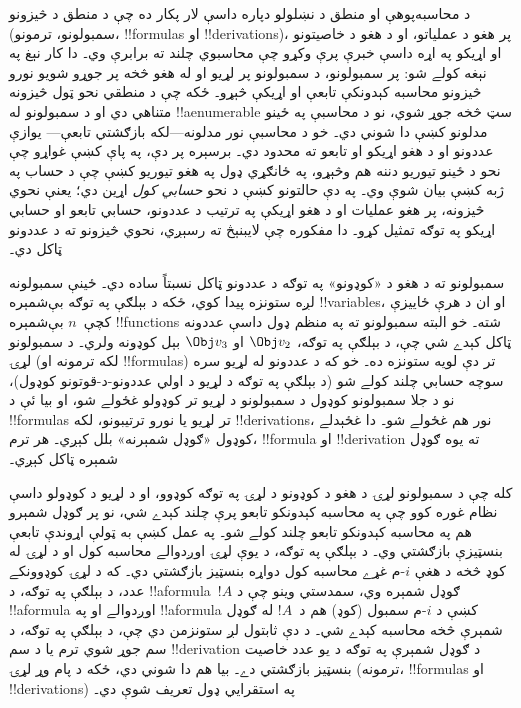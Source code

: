 \documentclass[../../../include/open-logic-section]{subfiles}
\begin{document}

د محاسبه‌پوهې او منطق د نښلولو دپاره داسې لار پکار ده چې د منطق د
څيزونو (سمبولونو، ترمونو، !!{formula}s او !!{derivation}s)، پر هغو د
عملياتو، او د هغو د خاصيتونو او اړيکو په اړه داسې خبرې پرې وکړو چې
محاسبوي چلند ته برابرې وي۔ دا کار نېغ په نېغه کولے شو: پر سمبولونو،
د سمبولونو پر لړيو او له هغو څخه پر جوړو شويو نورو څيزونو محاسبه
کېدونکې تابعې او اړيکې څېړو۔ ځکه چې د منطقي نحو ټول څيزونه متناهي دي
او د سمبولونو له !!a{enumerable} سټ څخه جوړ شوي، نو د محاسبې په ځينو
مدلونو کښې دا شوني دي۔ خو د محاسبې نور مدلونه---لکه بازګشتي تابعې---
يوازې عددونو او د هغو اړيکو او تابعو ته محدود دي۔ برسېره پر دې، په
پاې کښې غواړو چې نحو د ځينو تيوريو دننه هم وڅېړو، په ځانګړي ډول په
هغو تيوريو کښې چې د حساب په ژبه کښې بيان شوې وي۔ په دې حالتونو کښې
د نحو \emph{حسابي کول} اړين دي؛ يعنې نحوي څيزونه، پر هغو عمليات او د
هغو اړيکې په ترتيب د عددونو، حسابي تابعو او حسابي اړيکو په توګه
تمثيل کړو۔ دا مفکوره چې لايبنېڅ ته رسېږي، نحوي څيزونو ته د عددونو
ټاکل دي۔

سمبولونو ته د هغو د «کوډونو» په توګه د عددونو ټاکل نسبتاً ساده دي۔
ځينې سمبولونه لږه ستونزه پيدا کوي، ځکه د بېلګې په توګه بې‌شمېره
!!{variable}s، او ان د هرې ځاييزې کچې~$n$ بې‌شمېره !!{function}s شته۔ خو
البته سمبولونو ته په منظم ډول داسې عددونه ټاکل کېدے شي چې، د بېلګې
په توګه، $\Obj v_2$ او $\Obj v_3$ بېل کوډونه ولري۔ د سمبولونو لړۍ
(لکه ترمونه او !!{formula}s) تر دې لويه ستونزه ده۔ خو که د عددونو له
لړيو سره سوچه حسابي چلند کولے شو (د بېلګې په توګه د لړيو د اولي
عددونو-د-قوتونو کوډول)، نو د جلا سمبولونو کوډول د سمبولونو د لړيو تر
کوډولو غځولے شو، او بيا ئې د !!{formula}s تر لړيو يا نورو ترتيبونو،
لکه !!{derivation}s، نور هم غځولے شو۔ دا غځېدلے کوډول «ګوډل شمېرنه»
بلل کېږي۔ هر ترم، !!{formula} او !!{derivation} ته يوه ګوډل شمېره
ټاکل کېږي۔

کله چې د سمبولونو لړۍ د هغو د کوډونو د لړۍ په توګه کوډوو، او د لړيو
د کوډولو داسې نظام غوره کوو چې په محاسبه کېدونکو تابعو پرې چلند کېدے
شي، نو پر ګوډل شمېرو هم په محاسبه کېدونکو تابعو چلند کولے شو۔ په عمل
کښې به ټولې اړوندې تابعې بنسټيزې بازګشتي وي۔ د بېلګې په توګه، د يوې
لړۍ اوږدوالے محاسبه کول او د لړۍ له کوډ څخه د هغې $i$-م غړے محاسبه
کول دواړه بنسټيز بازګشتي دي۔ که د لړۍ کوډوونکے عدد، د بېلګې په توګه،
د !!a{formula}~$!A$ ګوډل شمېره وي، سمدستي وينو چې د !!a{formula}
اوږدوالے او په !!a{formula} کښې د $i$-م سمبول (کوډ) هم د~$!A$ له
ګوډل شمېرې څخه محاسبه کېدے شي۔ د دې ثابتول لږ ستونزمن دي چې، د بېلګې
په توګه، د سم جوړ شوي ترم يا د سم !!{derivation} د ګوډل شمېرې په
توګه د يو عدد خاصيت بنسټيز بازګشتي دے۔ بيا هم دا شوني دي، ځکه د پام
وړ لړۍ (ترمونه، !!{formula}s او !!{derivation}s) په استقرايي ډول
تعريف شوې دي۔
\end{document}
